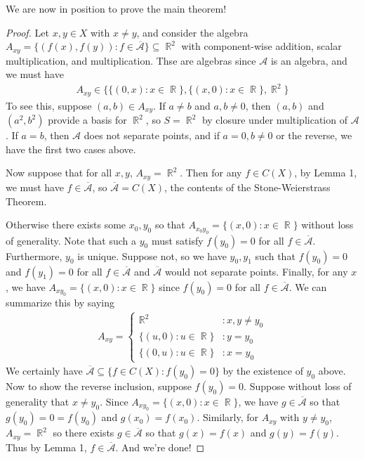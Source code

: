 \documentclass[12pt, a4paper]{book}
\DeclareMathOperator{\R}{\mathbb{R}}
\theoremstyle{nonumberplain}
\newtheorem{proof}{Proof}
\begin{document}
We are now in position to prove the main theorem!
\begin{proof}
    Let $x,y\in X$ with $x\neq y$, and consider the algebra $A_{xy}=\{(f(x),f(y)):f\in \overline{\mathcal{A}}\}\subseteq\R^2$ with component-wise addition, scalar multiplication, and multiplication.
    Thse are algebras since $\mathcal{A}$ is an algebra, and we must have
    \begin{align*}
        A_{xy}\in\{\{(0,x):x\in\R\},\{(x,0):x\in\R\},{\R}^2\}
    \end{align*}
    To see this, suppose $(a,b)\in A_{xy}$.
    If $a\neq b$ and $a,b\neq 0$, then $(a,b)$ and $(a^2,b^2)$ provide a basis for $\R^2$, so $S=\R^2$ by closure under multiplication of $\mathcal{A}$.
    If $a=b$, then $\mathcal{A}$ does not separate points, and if $a=0,b\neq 0$ or the reverse, we have the first two cases above.

    Now suppose that for all $x,y$, $A_{xy}=\R^2$.
    Then for any $f\in C(X)$, by Lemma 1, we must have $f\in\overline{\mathcal{A}}$, so $\overline{\mathcal{A}}=C(X)$, the contents of the Stone-Weierstrass Theorem.

    Otherwise there exists some $x_0,y_0$ so that $A_{x_0y_0}=\{(x,0):x\in\R\}$ without loss of generality.
    Note that such a $y_0$ must satisfy $f(y_0)=0$ for all $f\in\overline{\mathcal{A}}$.
    Furthermore, $y_0$ is unique.
    Suppose not, so we have $y_0,y_1$ such that $f(y_0)=0$ and $f(y_1)=0$ for all $f\in\mathcal{\overline{A}}$ and $\mathcal{\overline{A}}$ would not separate points.
    Finally, for any $x$, we have $A_{xy_0}=\{(x,0):x\in\R\}$ since $f(y_0)=0$ for all $f\in\overline{\mathcal{A}}$.
    We can summarize this by saying
    \begin{align*}
        A_{xy}=\begin{cases}
            {\R}^2 &: x,y\neq y_0\\
            \{(u,0):u\in\R\} &: y=y_0\\
            \{(0,u):u\in\R\} &: x=y_0
        \end{cases}
    \end{align*}
    We certainly have $\overline{\mathcal{A}}\subseteq\{f\in C(X):f(y_0)=0\}$ by the existence of $y_0$ above.
    Now to show the reverse inclusion, suppose $f(y_0)=0$.
    Suppose without loss of generality that $x\neq y_0$.
    Since $A_{xy_0}=\{(x,0):x\in\R\}$, we have $g\in\overline{\mathcal{A}}$ so that $g(y_0)=0=f(y_0)$ and $g(x_0)=f(x_0)$.
    Similarly, for $A_{xy}$ with $y\neq y_0$, $A_{xy}=\R^2$ so there exists $g\in\overline{\mathcal{A}}$ so that $g(x)=f(x)$ and $g(y)=f(y)$.
    Thus by Lemma 1, $f\in\overline{\mathcal{A}}$.
    And we're done!
\end{proof}
\end{document}
